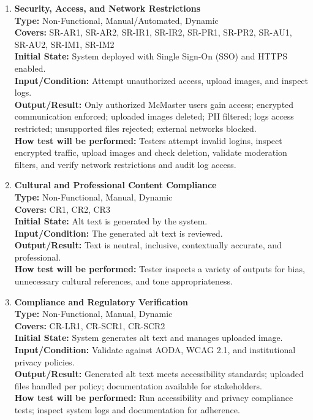 \documentclass[12pt, titlepage]{article}
\begin{document}
\begin{enumerate}[label=NFR-ST \arabic*., wide=0pt, leftmargin=*]
  \item \textbf{Security, Access, and Network Restrictions} \\[2mm]
    \textbf{Type:} Non-Functional, Manual/Automated, Dynamic \\
    \textbf{Covers:} SR-AR1, SR-AR2, SR-IR1, SR-IR2, SR-PR1, SR-PR2,
    SR-AU1, SR-AU2, SR-IM1, SR-IM2 \\
    \textbf{Initial State:} System deployed with Single Sign-On (SSO) and HTTPS enabled. \\
    \textbf{Input/Condition:} Attempt unauthorized access, upload
    images, and inspect logs. \\
    \textbf{Output/Result:} Only authorized McMaster users gain
    access; encrypted communication enforced; uploaded images
    deleted; PII filtered; logs access restricted; unsupported files
    rejected; external networks blocked. \\[2mm]
    \textbf{How test will be performed:} Testers attempt invalid
    logins, inspect encrypted traffic, upload images and check
    deletion, validate moderation filters, and verify network
    restrictions and audit log access.

  \item \textbf{Cultural and Professional Content Compliance} \\[2mm]
    \textbf{Type:} Non-Functional, Manual, Dynamic \\
    \textbf{Covers:} CR1, CR2, CR3 \\
    \textbf{Initial State:} Alt text is generated by the system. \\
    \textbf{Input/Condition:} The generated alt text is reviewed. \\
    \textbf{Output/Result:} Text is neutral, inclusive, contextually
    accurate, and professional. \\[2mm]
    \textbf{How test will be performed:} Tester inspects a variety of
    outputs for bias, unnecessary cultural references, and tone appropriateness.

  \item \textbf{Compliance and Regulatory Verification} \\[2mm]
    \textbf{Type:} Non-Functional, Manual, Dynamic \\
    \textbf{Covers:} CR-LR1, CR-SCR1, CR-SCR2 \\
    \textbf{Initial State:} System generates alt text and manages
    uploaded image. \\
    \textbf{Input/Condition:} Validate against AODA, WCAG 2.1, and
    institutional privacy policies. \\
    \textbf{Output/Result:} Generated alt text meets accessibility
    standards; uploaded files handled per policy; documentation
    available for stakeholders. \\[2mm]
    \textbf{How test will be performed:} Run accessibility and
    privacy compliance tests; inspect system logs and documentation
    for adherence.


\end{enumerate}
\end{document}
